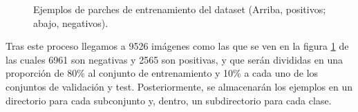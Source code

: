 \begin{figure}

  \caption{Ejemplos de parches de entrenamiento del dataset (Arriba, positivos; abajo, negativos).}\label{fig:dataset1}
\end{figure}

Tras este proceso llegamos a 9526 imágenes como las que se ven en la figura \ref{fig:dataset1} de las cuales 6961 son negativas y 2565 son positivas, y que serán divididas en una proporción de 80\% al conjunto de entrenamiento y 10\% a cada uno de los conjuntos de validación y test. Posteriormente, se almacenarán los ejemplos en un directorio para cada subconjunto y, dentro, un subdirectorio para cada clase.

